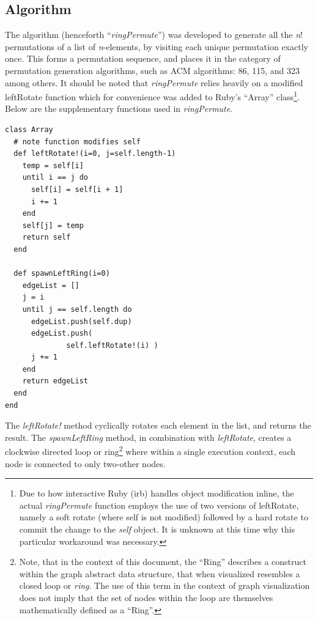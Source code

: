 \documentclass[12pt]{article}
\begin{document}
\newpage
\subsection{Algorithm}
The algorithm (henceforth ``\emph{ringPermute}'') was developed to generate all the \emph{n}! permutations of a list of \emph{n}-elements, by visiting each unique permutation exactly once.
This forms a permutation sequence, and places it in the category of permutation generation algorithms, such as ACM algorithms: 86, 115, and 323 \cite{Trotter:1962,Peck:1962,Ord-Smith:1968} among others.
It should be noted that \emph{ringPermute} relies heavily on a modified leftRotate function which for convenience was added to Ruby's ``Array'' class\footnote{Due to how interactive Ruby (irb) handles object modification inline, the actual \emph{ringPermute} function employs the use of two versions of leftRotate, namely a soft rotate (where self is not modified) followed by a hard rotate to commit the change to the \emph{self} object.
It is unknown at this time why this particular workaround was necessary.}.
Below are the supplementary functions used in \emph{ringPermute}.\\

\begin{multicols}{2}
\singlespacing
\begin{verbatim}
class Array
  # note function modifies self
  def leftRotate!(i=0, j=self.length-1)
    temp = self[i]
    until i == j do
      self[i] = self[i + 1]
      i += 1
    end
    self[j] = temp
    return self
  end

  def spawnLeftRing(i=0)
    edgeList = []
    j = i
    until j == self.length do
      edgeList.push(self.dup)
      edgeList.push(
              self.leftRotate!(i) )
      j += 1
    end
    return edgeList
  end
end
\end{verbatim}
\end{multicols}

\doublespacing
The \emph{leftRotate!} method cyclically rotates each element in the list, and returns the result.
The \emph{spawnLeftRing} method, in combination with \emph{leftRotate}, creates a clockwise directed loop or ring\footnote{Note, that in the context of this document, \linebreak[0] the ``Ring'' describes a construct within the graph abstract data structure, that when visualized resembles a closed loop or \emph{ring}.
The use of this term in the context of graph visualization does not imply that the set of nodes within the loop are themselves mathematically defined as a ``Ring''.} where within a single execution context, each node is connected to only two-other nodes.\\
\pagebreak[2]
\end{document}
